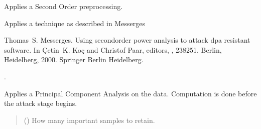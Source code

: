 \documentclass[letterpaper,10pt,english]{sphinxmanual}
\begin{document}
\begin{fulllineitems}
\begin{fulllineitems}
\end{fulllineitems}


\begin{fulllineitems}
\label{\detokenize{MLSCAlib.Data:MLSCAlib.Data.custom_manager.CustomDataManager.apply_messerges}}
\pysigstartsignatures
{}
\pysigstopsignatures
\sphinxAtStartPar
Applies a Second Order preprocessing.

\sphinxAtStartPar
Applies a technique as described in Messerges%
\begin{footnote}[5]\sphinxAtStartFootnote
Thomas S. Messerges. Using second\sphinxhyphen{}order power analysis to attack dpa resistant software. In Çetin K. Koç and Christof Paar, editors, , 238\textendash{}251. Berlin, Heidelberg, 2000. Springer Berlin Heidelberg.
%
\end{footnote}.

\end{fulllineitems}


\begin{fulllineitems}
\label{\detokenize{MLSCAlib.Data:MLSCAlib.Data.custom_manager.CustomDataManager.apply_pearson}}
\pysigstartsignatures
{}
\pysigstopsignatures
\sphinxAtStartPar
Applies a Principal Component Analysis on the data. Computation is done before the attack stage begins.
\begin{quote}\begin{description}
\sphinxAtStartPar
{} (\sphinxstyleliteralemphasis{\sphinxupquote{, }}) \textendash{} How many important samples to retain.

\end{description}\end{quote}


\end{fulllineitems}
\end{fulllineitems}
\end{document}
